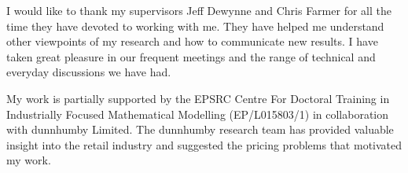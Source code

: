 \documentclass[main.tex]{subfiles}
\begin{document}
I would like to thank my supervisors Jeff Dewynne and Chris Farmer for
all the time they have devoted to working with me. They have helped me
understand other viewpoints of my research and how to communicate new
results. I have taken great pleasure in our frequent meetings and the
range of technical and everyday discussions we have had.

My work is partially supported by the EPSRC Centre For Doctoral
Training in Industrially Focused Mathematical Modelling (EP/L015803/1)
in collaboration with dunnhumby Limited.  The dunnhumby research team
has provided valuable insight into the retail industry and suggested
the pricing problems that motivated my work.
\end{document}
